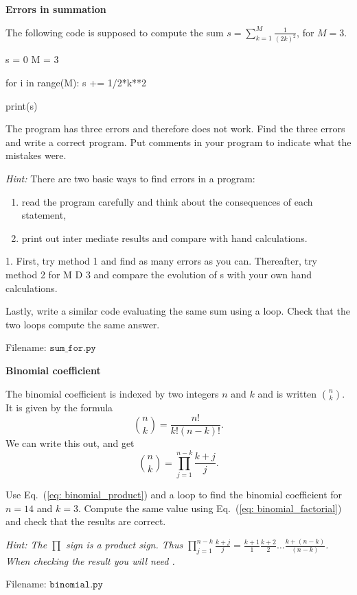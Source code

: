 	
\begin{Problem}{\textbf{Errors in summation}}\label{prob24}

\noindent The following code is supposed to compute the sum $s = \sum_{k = 1}^{M}\frac{1}{(2k)^2}$, for $M=3$.
\begin{python}
s = 0 
M = 3

for i in range(M):
    s += 1/2*k**2

print(s)
\end{python}
The program has three errors and therefore does not work. Find the three errors and write a correct program. Put comments in your program to indicate what the mistakes were.

\emph{Hint:} There are two basic ways to find errors in a program:
\begin{enumerate}
    \item read the program carefully and think about the consequences of each statement,
    \item print out inter mediate results and compare with hand calculations.
\end{enumerate}
1. 
First, try method 1 and find as many errors as you can. Thereafter, try method 2 for M D 3 and compare the evolution of s with your own hand calculations.

Lastly, write a similar code evaluating the same sum using a 
loop. Check that the two loops compute the same answer.

Filename: $\texttt{sum\_for.py}$
\end{Problem}
\newpage	
	
\begin{Problem}{\textbf{Binomial coefficient}}\label{prob25}

\noindent The binomial coefficient is indexed by two integers $n$ and $k$ and is written
$\binom{n}{k}$. It is given by the formula
\begin{equation}\label{eq: binomial_factorial}
\binom{n}{k} = \frac{n!}{k!(n-k)!}.
\end{equation}
We can write this out, and get
\begin{equation}\label{eq: binomial_product}
\binom{n}{k} = \prod_{j = 1}^{n - k}\frac{k + j}{j}.
\end{equation}

Use Eq.~(\ref{eq: binomial_product}) and a  loop to find the binomial coefficient
for $n = 14$ and $k = 3$. Compute the same value using Eq.~(\ref{eq: binomial_factorial})
and check that the results are correct.

\emph{Hint: The $\prod$ sign is a product sign. Thus
$\prod_{j = 1}^{n - k}\frac{k + j}{j} = \frac{k + 1}{1}\frac{k + 2}{2}
\dots\frac{k + (n - k)}{(n - k)}$. When checking the result you will need
.} 

Filename: $\texttt{binomial.py}$
\end{Problem}	
	
